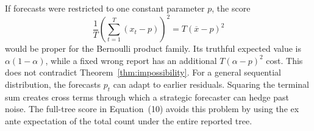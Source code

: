 \documentclass{article}
\theoremstyle{definition}
\theoremstyle{remark}
\newcommand{\1}{\mathbf 1}
\begin{document}
If forecasts were restricted to one constant parameter \(p\), the score \[ \frac1T\left(\sum_{t=1}^T(x_t-p)\right)^2 =T(\overline x-p)^2 \] would be proper for the Bernoulli product family. Its truthful expected value is \(\alpha(1-\alpha)\), while a fixed wrong report has an additional \(T(\alpha-p)^2\) cost. This does not contradict Theorem~\ref{thm:impossibility}. For a general sequential distribution, the forecasts \(p_t\) can adapt to earlier residuals. Squaring the terminal sum creates cross terms through which a strategic forecaster can hedge past noise. The full-tree score in Equation~(10) avoids this problem by using the ex ante expectation of the total count under the entire reported tree.
\end{document}
